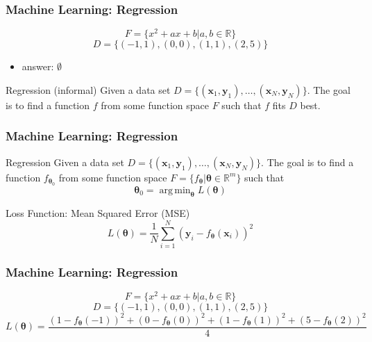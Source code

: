 \documentclass{beamer}
\DeclareMathOperator*{\argmin}{arg\,min}
\begin{document}
\begin{frame}
    \frametitle{Machine Learning: Regression}

    \begin{example}
        \[F = \{x^2 + ax + b \vert a, b \in \mathbb{R}\}\]
        \[D = \{(-1, 1), (0, 0), (1, 1), (2, 5)\}\]
        \begin{itemize}
            \item answer: $\emptyset$
        \end{itemize}
    \end{example}
    \pause
    \begin{block}{Regression (informal)}
        Given a data set $D = \{(\boldsymbol{x}_1, \boldsymbol{y}_1), \dots, (\boldsymbol{x}_N, \boldsymbol{y}_N)\}$. The goal is to find a function $f$ from some function space $F$ such that $f$ fits $D$ best.
    \end{block}

\end{frame}

\begin{frame}
    \frametitle{Machine Learning: Regression}

    \begin{block}{Regression}
        Given a data set $D = \{(\boldsymbol{x}_1, \boldsymbol{y}_1), \dots, (\boldsymbol{x}_N, \boldsymbol{y}_N)\}$. The goal is to find a function $f_{\boldsymbol{\theta}_0}$ from some function space $F = \{f_{\boldsymbol{\theta}} \vert \boldsymbol{\theta} \in \mathbb{R}^m\}$ such that
        \[\boldsymbol{\theta}_0 = \argmin_{\boldsymbol{\theta}} L(\boldsymbol{\theta})\]
    \end{block}
    
    \begin{block}{Loss Function: Mean Squared Error (MSE)}
        \[L(\boldsymbol{\theta}) = \frac{1}{N}\sum_{i = 1}^{N} (\boldsymbol{y}_i - f_{\boldsymbol{\theta}}(\boldsymbol{x}_i))^2\]
    \end{block}

\end{frame}

\begin{frame}
    \frametitle{Machine Learning: Regression}

    \begin{example}
        \[F = \{x^2 + ax + b \vert a, b \in \mathbb{R}\}\]
        \[D = \{(-1, 1), (0, 0), (1, 1), (2, 5)\}\]
        \[L(\boldsymbol{\theta}) = \frac{(1 - f_{\boldsymbol{\theta}}(-1))^2 + (0 - f_{\boldsymbol{\theta}}(0))^2 + (1 - f_{\boldsymbol{\theta}}(1))^2 + (5 - f_{\boldsymbol{\theta}}(2))^2}{4}\]
    \end{example}

\end{frame}
\end{document}
